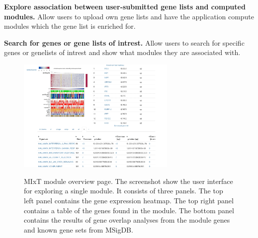 \textbf{Explore association between user-submitted gene lists and computed
modules.} Allow users to upload own gene lists and have the application compute
modules which the gene list is enriched for. 

\textbf{Search for genes or gene lists of intrest.} Allow users to search
for specific genes or genelists of intrest and show what modules they are
associated with. 

\begin{figure}[h!]
\centering
\caption{MIxT module overview page. The screenshot show the user interface for
exploring a single module. It consists of three panels. The top left panel
contains the gene expression heatmap. The top right panel contains a table of
the genes found in the module. The bottom panel contains the results of gene
overlap analyses from the module genes and known gene sets from MSigDB.}
\includegraphics[width=3in]{figures/module.png}
\label{fig_first_case}
\end{figure} 



